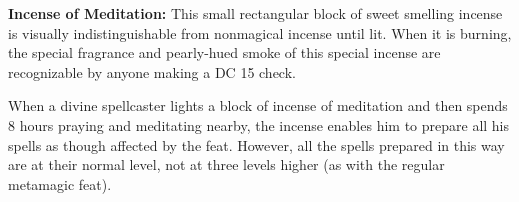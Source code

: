 





\textbf{Incense of Meditation:} This small rectangular block of sweet smelling incense is visually indistinguishable from nonmagical incense until lit. When it is burning, the special fragrance and pearly-hued smoke of this special incense are recognizable by anyone making a DC 15  check.

When a divine spellcaster lights a block of incense of meditation and then spends 8 hours praying and meditating nearby, the incense enables him to prepare all his spells as though affected by the  feat. However, all the spells prepared in this way are at their normal level, not at three levels higher (as with the regular metamagic feat).


